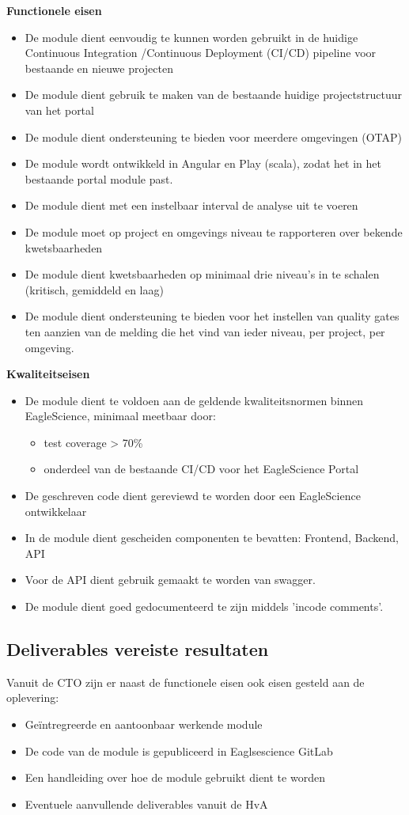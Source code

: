 \textbf{Functionele eisen}
\begin{itemize}
\item De module dient eenvoudig te kunnen worden gebruikt in de huidige Continuous Integration /Continuous Deployment (CI/CD) pipeline voor bestaande en nieuwe projecten
\item De module dient gebruik te maken van de bestaande huidige projectstructuur van het portal
\item De module dient ondersteuning te bieden voor meerdere omgevingen (OTAP)
\item De module wordt ontwikkeld in Angular en Play (scala), zodat het in het bestaande portal module past.
\item De module dient met een instelbaar interval de analyse uit te voeren
\item De module moet op project en omgevings niveau te rapporteren over bekende kwetsbaarheden
\item De module dient kwetsbaarheden op minimaal drie niveau’s in te schalen (kritisch, gemiddeld en laag)
\item De module dient ondersteuning te bieden voor het instellen van quality gates ten aanzien van de melding die het vind van ieder niveau, per project, per omgeving.
\end{itemize}
\textbf{Kwaliteitseisen}
\begin{itemize}
\item De module dient te voldoen aan de geldende kwaliteitsnormen binnen EagleScience, minimaal meetbaar door:
	\begin{itemize}
	\item test coverage > 70\%
	\item onderdeel van de bestaande CI/CD voor het EagleScience Portal
	\end{itemize}
\item De geschreven code dient gereviewd te worden door een EagleScience ontwikkelaar
\item In de module dient gescheiden componenten te bevatten: Frontend, Backend, API
\item Voor de API dient gebruik gemaakt te worden van swagger.
\item De module dient goed gedocumenteerd te zijn middels 'incode comments'.
\end{itemize}

\subsection{Deliverables vereiste resultaten}\label{subsec:deliverables-vereiste-resultaten}
Vanuit de CTO zijn er naast de functionele eisen ook eisen gesteld aan de oplevering:
\begin{itemize}
\item Geïntregreerde en aantoonbaar werkende module
\item De code van de module is gepubliceerd in Eaglsescience GitLab
\item Een handleiding over hoe de module gebruikt dient te worden
\item Eventuele aanvullende deliverables vanuit de HvA
\end{itemize}

